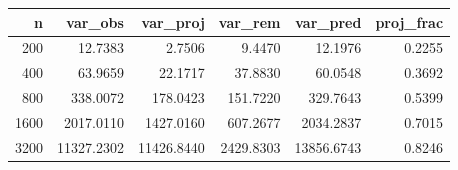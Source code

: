 \begin{tabular}{rrrrrr}
\toprule
n & var_obs & var_proj & var_rem & var_pred & proj_frac \\
\midrule
200 & 12.7383 & 2.7506 & 9.4470 & 12.1976 & 0.2255 \\
400 & 63.9659 & 22.1717 & 37.8830 & 60.0548 & 0.3692 \\
800 & 338.0072 & 178.0423 & 151.7220 & 329.7643 & 0.5399 \\
1600 & 2017.0110 & 1427.0160 & 607.2677 & 2034.2837 & 0.7015 \\
3200 & 11327.2302 & 11426.8440 & 2429.8303 & 13856.6743 & 0.8246 \\
\bottomrule
\end{tabular}

